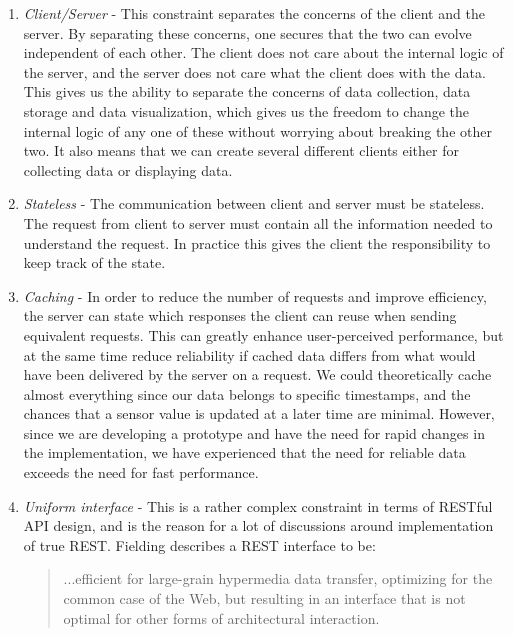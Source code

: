 \begin{enumerate}
\item{} \emph{Client/Server} - This constraint separates the concerns of the client and the server. By separating these concerns, one secures that the two can evolve independent of each other. The client does not care about the internal logic of the server, and the server does not care what the client does with the data. This gives us the ability to separate the concerns of data collection, data storage and data visualization, which gives us the freedom to change the internal logic of any one of these without worrying about breaking the other two. It also means that we can create several different clients either for collecting data or displaying data.

\item{} \emph{Stateless} - The communication between client and server must be stateless. The request from client to server must contain all the information needed to understand the request. In practice this gives the client the responsibility to keep track of the state.

\item{} \emph{Caching} - In order to reduce the number of requests and improve efficiency, the server can state which responses the client can reuse when sending equivalent requests. This can greatly enhance user-perceived performance, but at the same time reduce reliability if cached data differs from what would have been delivered by the server on a request. We could theoretically cache almost everything since our data belongs to specific timestamps, and the chances that a sensor value is updated at a later time are minimal. However, since we are developing a prototype and have the need for rapid changes in the implementation, we have experienced that the need for reliable data exceeds the need for fast performance.

\item{} \emph{Uniform interface} - This is a rather complex constraint in terms of RESTful API design, and is the reason for a lot of discussions around implementation of true REST. Fielding describes a REST interface to be:

\begin{quote} ...efficient for large-grain hypermedia data transfer, optimizing for the common case of the Web, but resulting in an interface that is not optimal for other forms of architectural interaction. \citep[p. 82]{fielding2000architectural} 
\end{quote}


\end{enumerate}
